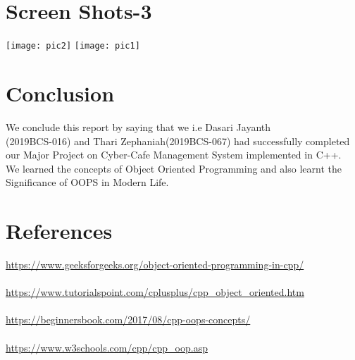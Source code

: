 \documentclass[12pt]{article}
\begin{document}
\section{Screen Shots-3}
\vspace{2cm}

\texttt{[image: pic2]}
\texttt{[image: pic1]}


\begin{figure}[h]
\end{figure}
\newpage

\section{Conclusion}
\vspace{1cm}
We conclude this report by saying that we i.e Dasari Jayanth\\(2019BCS-016) and Thari Zephaniah(2019BCS-067) had successfully completed our Major Project on Cyber-Cafe Management System implemented in C++.\\
We learned the concepts of Object Oriented Programming and also learnt the Significance of OOPS in Modern Life.

\vspace{2cm}
\section{References}
\vspace{1cm}

\url{https://www.geeksforgeeks.org/object-oriented-programming-in-cpp/}
\\ \\
\url{https://www.tutorialspoint.com/cplusplus/cpp_object_oriented.htm}
\\  \\ 
\url{https://beginnersbook.com/2017/08/cpp-oops-concepts/}
\\ \\
\url{https://www.w3schools.com/cpp/cpp_oop.asp}
\end{document}
